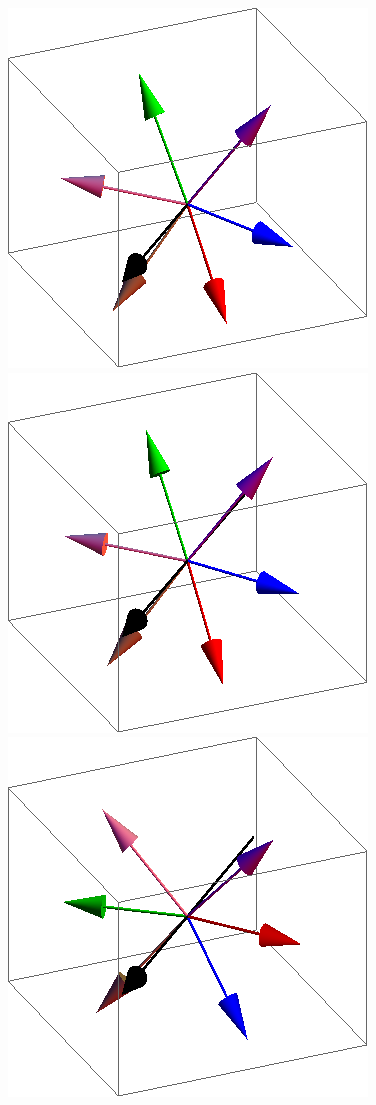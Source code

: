 \documentclass{article}
\begin{document}
\begin{figure}[ht]
\centering
\includegraphics[scale=0.23]{110/1S005to000R.png}
\includegraphics[scale=0.23]{110/241S005to000R.png}
\includegraphics[scale=0.23]{110/300S005to000R.png}

\end{figure}
\end{document}
